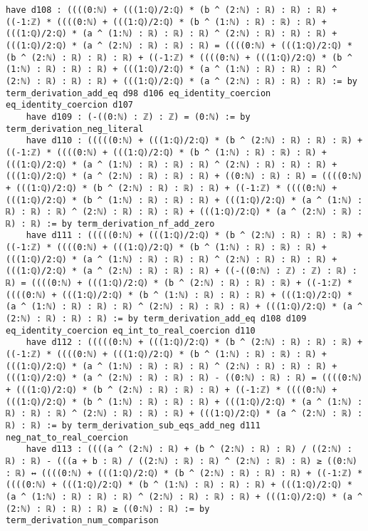 \documentclass{article}
\begin{document}
\begin{tcolorbox}[colback=white!10, width=\linewidth]
\begin{lstlisting}[language=Lean4]
    have d108 : ((((0:ℕ) + (((1:ℚ)/2:ℚ) * (b ^ (2:ℕ) : ℝ) : ℝ) : ℝ) + ((-1:ℤ) * ((((0:ℕ) + (((1:ℚ)/2:ℚ) * (b ^ (1:ℕ) : ℝ) : ℝ) : ℝ) + (((1:ℚ)/2:ℚ) * (a ^ (1:ℕ) : ℝ) : ℝ) : ℝ) ^ (2:ℕ) : ℝ) : ℝ) : ℝ) + (((1:ℚ)/2:ℚ) * (a ^ (2:ℕ) : ℝ) : ℝ) : ℝ) = ((((0:ℕ) + (((1:ℚ)/2:ℚ) * (b ^ (2:ℕ) : ℝ) : ℝ) : ℝ) + ((-1:ℤ) * ((((0:ℕ) + (((1:ℚ)/2:ℚ) * (b ^ (1:ℕ) : ℝ) : ℝ) : ℝ) + (((1:ℚ)/2:ℚ) * (a ^ (1:ℕ) : ℝ) : ℝ) : ℝ) ^ (2:ℕ) : ℝ) : ℝ) : ℝ) + (((1:ℚ)/2:ℚ) * (a ^ (2:ℕ) : ℝ) : ℝ) : ℝ) := by term_derivation_add_eq d98 d106 eq_identity_coercion eq_identity_coercion d107
    have d109 : (-((0:ℕ) : ℤ) : ℤ) = (0:ℕ) := by term_derivation_neg_literal
    have d110 : (((((0:ℕ) + (((1:ℚ)/2:ℚ) * (b ^ (2:ℕ) : ℝ) : ℝ) : ℝ) + ((-1:ℤ) * ((((0:ℕ) + (((1:ℚ)/2:ℚ) * (b ^ (1:ℕ) : ℝ) : ℝ) : ℝ) + (((1:ℚ)/2:ℚ) * (a ^ (1:ℕ) : ℝ) : ℝ) : ℝ) ^ (2:ℕ) : ℝ) : ℝ) : ℝ) + (((1:ℚ)/2:ℚ) * (a ^ (2:ℕ) : ℝ) : ℝ) : ℝ) + ((0:ℕ) : ℝ) : ℝ) = ((((0:ℕ) + (((1:ℚ)/2:ℚ) * (b ^ (2:ℕ) : ℝ) : ℝ) : ℝ) + ((-1:ℤ) * ((((0:ℕ) + (((1:ℚ)/2:ℚ) * (b ^ (1:ℕ) : ℝ) : ℝ) : ℝ) + (((1:ℚ)/2:ℚ) * (a ^ (1:ℕ) : ℝ) : ℝ) : ℝ) ^ (2:ℕ) : ℝ) : ℝ) : ℝ) + (((1:ℚ)/2:ℚ) * (a ^ (2:ℕ) : ℝ) : ℝ) : ℝ) := by term_derivation_nf_add_zero
    have d111 : (((((0:ℕ) + (((1:ℚ)/2:ℚ) * (b ^ (2:ℕ) : ℝ) : ℝ) : ℝ) + ((-1:ℤ) * ((((0:ℕ) + (((1:ℚ)/2:ℚ) * (b ^ (1:ℕ) : ℝ) : ℝ) : ℝ) + (((1:ℚ)/2:ℚ) * (a ^ (1:ℕ) : ℝ) : ℝ) : ℝ) ^ (2:ℕ) : ℝ) : ℝ) : ℝ) + (((1:ℚ)/2:ℚ) * (a ^ (2:ℕ) : ℝ) : ℝ) : ℝ) + ((-((0:ℕ) : ℤ) : ℤ) : ℝ) : ℝ) = ((((0:ℕ) + (((1:ℚ)/2:ℚ) * (b ^ (2:ℕ) : ℝ) : ℝ) : ℝ) + ((-1:ℤ) * ((((0:ℕ) + (((1:ℚ)/2:ℚ) * (b ^ (1:ℕ) : ℝ) : ℝ) : ℝ) + (((1:ℚ)/2:ℚ) * (a ^ (1:ℕ) : ℝ) : ℝ) : ℝ) ^ (2:ℕ) : ℝ) : ℝ) : ℝ) + (((1:ℚ)/2:ℚ) * (a ^ (2:ℕ) : ℝ) : ℝ) : ℝ) := by term_derivation_add_eq d108 d109 eq_identity_coercion eq_int_to_real_coercion d110
    have d112 : (((((0:ℕ) + (((1:ℚ)/2:ℚ) * (b ^ (2:ℕ) : ℝ) : ℝ) : ℝ) + ((-1:ℤ) * ((((0:ℕ) + (((1:ℚ)/2:ℚ) * (b ^ (1:ℕ) : ℝ) : ℝ) : ℝ) + (((1:ℚ)/2:ℚ) * (a ^ (1:ℕ) : ℝ) : ℝ) : ℝ) ^ (2:ℕ) : ℝ) : ℝ) : ℝ) + (((1:ℚ)/2:ℚ) * (a ^ (2:ℕ) : ℝ) : ℝ) : ℝ) - ((0:ℕ) : ℝ) : ℝ) = ((((0:ℕ) + (((1:ℚ)/2:ℚ) * (b ^ (2:ℕ) : ℝ) : ℝ) : ℝ) + ((-1:ℤ) * ((((0:ℕ) + (((1:ℚ)/2:ℚ) * (b ^ (1:ℕ) : ℝ) : ℝ) : ℝ) + (((1:ℚ)/2:ℚ) * (a ^ (1:ℕ) : ℝ) : ℝ) : ℝ) ^ (2:ℕ) : ℝ) : ℝ) : ℝ) + (((1:ℚ)/2:ℚ) * (a ^ (2:ℕ) : ℝ) : ℝ) : ℝ) := by term_derivation_sub_eqs_add_neg d111 neg_nat_to_real_coercion
    have d113 : ((((a ^ (2:ℕ) : ℝ) + (b ^ (2:ℕ) : ℝ) : ℝ) / ((2:ℕ) : ℝ) : ℝ) - (((a + b : ℝ) / ((2:ℕ) : ℝ) : ℝ) ^ (2:ℕ) : ℝ) : ℝ) ≥ ((0:ℕ) : ℝ) ↔ ((((0:ℕ) + (((1:ℚ)/2:ℚ) * (b ^ (2:ℕ) : ℝ) : ℝ) : ℝ) + ((-1:ℤ) * ((((0:ℕ) + (((1:ℚ)/2:ℚ) * (b ^ (1:ℕ) : ℝ) : ℝ) : ℝ) + (((1:ℚ)/2:ℚ) * (a ^ (1:ℕ) : ℝ) : ℝ) : ℝ) ^ (2:ℕ) : ℝ) : ℝ) : ℝ) + (((1:ℚ)/2:ℚ) * (a ^ (2:ℕ) : ℝ) : ℝ) : ℝ) ≥ ((0:ℕ) : ℝ) := by term_derivation_num_comparison

\end{lstlisting}
\end{tcolorbox}
\end{document}
